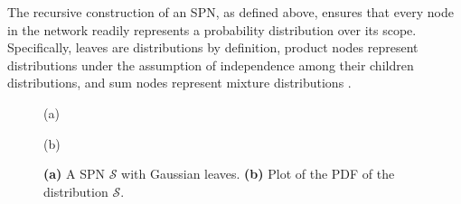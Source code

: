 The recursive construction of an SPN, as defined above, ensures that every node in the network readily represents a probability distribution over its scope. Specifically, leaves are distributions by definition, product nodes represent distributions under the assumption of independence among their children distributions, and sum nodes represent mixture distributions \citep{Peharz2015}.

\begin{figure}
  \begin{minipage}{0.5\textwidth}
    \centering

    (a)
  \end{minipage}\begin{minipage}{0.5\textwidth}
    \centering

    (b)
  \end{minipage}

  \caption[A GSPN and a plot of its PDF]{
    \textbf{(a)} A SPN $\mathcal{S}$ with Gaussian leaves.
    \textbf{(b)} Plot of the PDF of the distribution $\mathcal{S}$.
  }
  \label{fig:gspn}
\end{figure}

